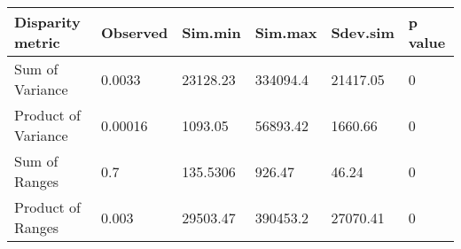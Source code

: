 
\begin{tabular}[t]{l l l l l l }		%
\hline
\textbf{Disparity metric} & \textbf{Observed} & \textbf{Sim.min} & \textbf{Sim.max} & \textbf{Sdev.sim} & \textbf{p value} \\
\hline
Sum of Variance & 0.0033 & 23128.23 & 334094.4 & 21417.05 &	0\\
Product of Variance	& 0.00016 & 1093.05 &	56893.42 &	1660.66 & 0\\
Sum of Ranges &	0.7 &	135.5306 &	926.47 &	46.24 & 0 \\
Product of Ranges & 0.003 & 29503.47 & 390453.2 &	27070.41 &	0\\
\hline
\end{tabular}